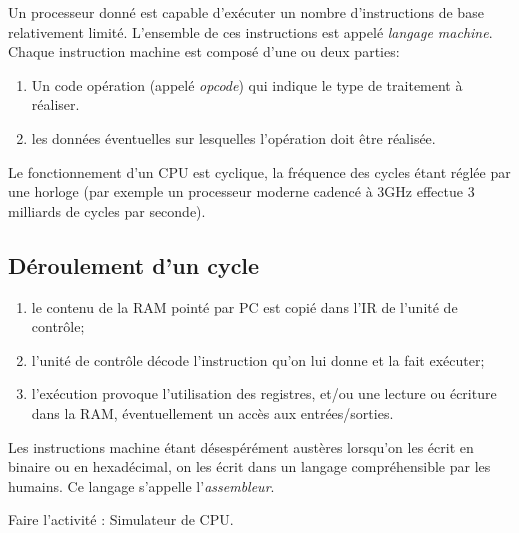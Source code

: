 \documentclass[a4paper,12pt,french]{book}
\begin{document}
Un processeur donné est capable d'exécuter un nombre d'instructions de base relativement limité. L'ensemble de ces instructions est appelé \textit{langage machine}. Chaque instruction machine est composé d'une ou deux parties:
\begin{enumerate}[--]
	\item 	Un code opération (appelé \textit{opcode}) qui indique le type de traitement à réaliser.

	\item 	les données éventuelles sur lesquelles l'opération doit être réalisée.
\end{enumerate}

Le fonctionnement d'un CPU est cyclique, la fréquence des cycles étant réglée par une horloge (par exemple un processeur moderne cadencé à 3GHz effectue 3 milliards de cycles par seconde).

\subsection*{Déroulement d'un cycle}

\begin{enumerate}[--]
	\item 	le contenu de la RAM pointé par PC est copié dans l'IR de l'unité de contrôle;
	\item 	l'unité de contrôle décode l'instruction qu'on lui donne et la fait exécuter;
	\item 	l'exécution provoque l'utilisation des registres, et/ou une lecture ou écriture dans la RAM, éventuellement un accès aux entrées/sorties.
\end{enumerate}

Les instructions machine étant \og désespérément austères\fg{} lorsqu'on les écrit en binaire ou en hexadécimal, on les écrit dans un langage compréhensible par les humains. Ce langage s'appelle l'\textit{assembleur}.

\begin{exercice}[]
	Faire l'activité : Simulateur de CPU.
\end{exercice}
\end{document}
